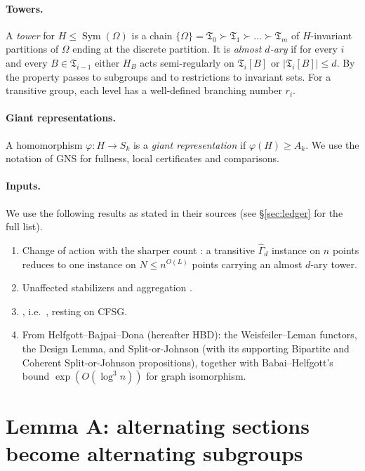 \documentclass[11pt]{article}
\theoremstyle{definition}
\theoremstyle{remark}
\newcommand{\Sym}{\operatorname{Sym}}
\newcommand{\fT}{\mathfrak T}
\newcommand{\Gammahat}{\widehat\Gamma}
\begin{document}
\paragraph{Towers.} A \emph{tower} for $H\le\Sym(\Omega)$ is a chain $\{\Omega\}=\fT_0\succ\fT_1\succ\dots\succ\fT_m$ of $H$-invariant partitions of $\Omega$ ending at the discrete partition. It is \emph{almost $d$-ary} if for every $i$ and every $B\in\fT_{i-1}$ either $H_B$ acts semi-regularly on $\fT_i[B]$ or $|\fT_i[B]|\le d$. By \cite[Obs.~4.2]{GNS} the property passes to subgroups and to restrictions to invariant sets. For a transitive group, each level has a well-defined branching number $r_i$.

\paragraph{Giant representations.} A homomorphism $\varphi\colon H\to S_k$ is a \emph{giant representation} if $\varphi(H)\ge A_k$. We use the notation of GNS for fullness, local certificates and comparisons.

\paragraph{Inputs.} We use the following results as stated in their sources (see \S\ref{sec:ledger} for the full list).
\begin{enumerate}
\item[(G1)] Change of action \cite[Thms~4.3,~4.6]{GNS} with the sharper count \cite[Thm~4.16]{GN21}: a transitive $\Gammahat_d$ instance on $n$ points reduces to one instance on $N\le n^{O(L)}$ points carrying an almost $d$-ary tower.
\item[(G2)] Unaffected stabilizers and aggregation \cite[Thm~5.8, Lemmas~6.2, 6.3, 6.6, 6.7, 6.9, App.~A]{GNS}.
\item[(G3)] \cite[Lemma~7.1]{GNS}, i.e.\ \cite[Thm~3.2.1]{Bab15}, resting on CFSG.
\item[(H)] From Helfgott--Bajpai--Dona \cite{HBD} (hereafter HBD): the Weisfeiler--Leman functors, the Design Lemma, and Split-or-Johnson (with its supporting Bipartite and Coherent Split-or-Johnson propositions), together with Babai--Helfgott's bound $\exp(O(\log^3 n))$ for graph isomorphism.
\end{enumerate}

\section{Lemma A: alternating sections become alternating subgroups}\label{sec:A}
\end{document}

